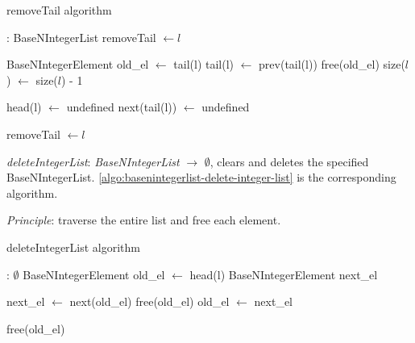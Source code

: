 \documentclass[book, nodocumentinfo]{upmethodology-document}
\begin{document}
\begin{algorithm}[H]
    \label{algo:basenintegerlist-remove-tail}
    \caption{removeTail algorithm}

    \begin{algorithmic}
         : BaseNIntegerList
                \State removeTail \(\leftarrow l\)
            \EndIf

            \State BaseNIntegerElement old\_el \(\leftarrow\) tail(l)
            \State tail(l) \(\leftarrow\) prev(tail(l))
            \State free(old\_el)
            \State size(\(l\)) \(\leftarrow\) size(\(l\)) - 1

                \State head(l) \(\leftarrow\) undefined
            \Else
                \State next(tail(l)) \(\leftarrow\) undefined
            \EndIf

            \State removeTail \(\leftarrow l\)
        \EndFunction
    \end{algorithmic}
\end{algorithm}


\emph{deleteIntegerList}: \emph{BaseNIntegerList} \(\rightarrow\) \(\emptyset\),
clears and deletes the specified BaseNIntegerList.
\ref{algo:basenintegerlist-delete-integer-list} is the corresponding algorithm.

\emph{Principle}: traverse the entire list and free each element.

\begin{algorithm}[H]
    \label{algo:basenintegerlist-delete-integer-list}
    \caption{deleteIntegerList algorithm}

    \begin{algorithmic}
         : \(\emptyset\)
                \State BaseNIntegerElement old\_el \(\leftarrow\) head(l)
                \State BaseNIntegerElement next\_el

                    \State next\_el \(\leftarrow\) next(old\_el)
                    \State free(old\_el)
                    \State old\_el \(\leftarrow\) next\_el
                \EndWhile

                \State free(old\_el)
            \EndIf
        \EndFunction
    \end{algorithmic}
\end{algorithm}
\end{document}
